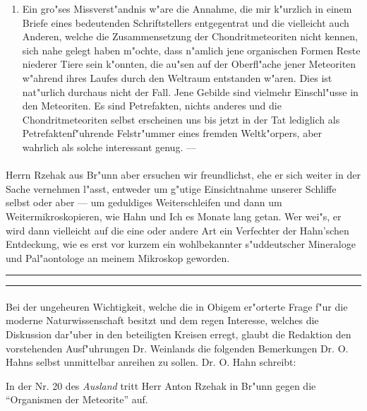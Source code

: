 \documentclass[a4paper, 12pt, oneside]{article}
\begin{document}
\begin{enumerate}
    \item Ein gro"ses Missverst"andnis w"are die Annahme, die mir k"urzlich in einem Briefe eines bedeutenden Schriftstellers entgegentrat und die vielleicht auch Anderen, welche die Zusammensetzung der Chondritmeteoriten nicht kennen, sich nahe gelegt haben m"ochte, dass n"amlich jene organischen Formen Reste niederer Tiere sein k"onnten, die au"sen auf der Oberfl"ache jener Meteoriten w"ahrend ihres Laufes durch den Weltraum entstanden w"aren. Dies ist nat"urlich durchaus nicht der Fall. Jene Gebilde sind vielmehr Einschl"usse in den Meteoriten. Es sind Petrefakten, nichts anderes und die Chondritmeteoriten selbst erscheinen uns bis jetzt in der Tat lediglich als Petrefaktenf"uhrende Felstr"ummer eines fremden Weltk"orpers, aber wahrlich als solche interessant genug. ---
\end{enumerate}
\paragraph{}
Herrn Rzehak aus Br"unn aber ersuchen wir freundlichst, ehe er sich weiter in der Sache vernehmen l"asst, entweder um g"utige Einsichtnahme unserer Schliffe selbst oder aber --- um geduldiges Weiterschleifen und dann um Weitermikroskopieren, wie Hahn und Ich es Monate lang getan. Wer wei"s, er wird dann vielleicht auf die eine oder andere Art ein Verfechter der Hahn'schen Entdeckung, wie es erst vor kurzem ein wohlbekannter s"uddeutscher Mineraloge und Pal"aontologe an meinem Mikroskop geworden.
\rule{\textwidth}{1.6pt}\vspace*{-\baselineskip}\vspace*{2pt} %
\rule{\textwidth}{0.4pt} %
\paragraph{}
Bei der ungeheuren Wichtigkeit, welche die in Obigem er"orterte Frage f"ur die moderne Naturwissenschaft besitzt und dem regen Interesse, welches die Diskussion dar"uber in den beteiligten Kreisen erregt, glaubt die Redaktion den vorstehenden Ausf"uhrungen Dr. Weinlands die folgenden Bemerkungen Dr. O. Hahns selbst unmittelbar anreihen zu sollen. Dr. O. Hahn schreibt:

In der Nr. 20 des \emph{Ausland} tritt Herr Anton Rzehak in Br"unn gegen die "`Organismen der Meteorite"' auf.
\end{document}
